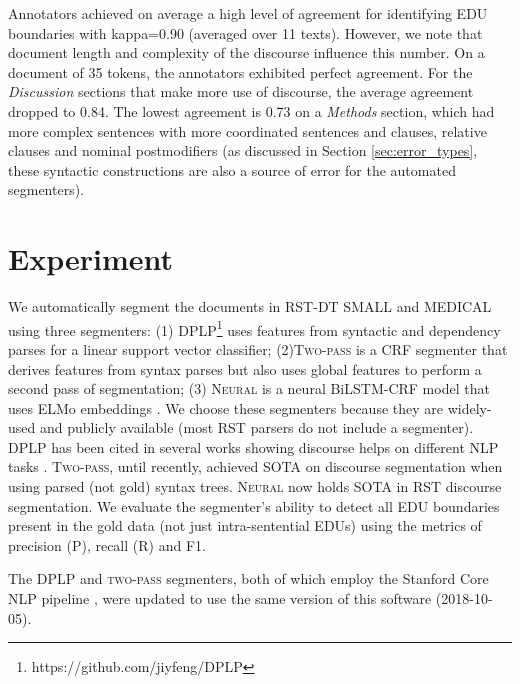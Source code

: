 \medskip
{} Annotators achieved on average a high level of agreement for identifying EDU boundaries with kappa=0.90 (averaged over 11 texts). However, we note that document length and complexity of the discourse influence this number. On a document of 35 tokens, the annotators exhibited perfect agreement. For the \textit{Discussion} sections that make more use of discourse, the average agreement dropped to 0.84. The lowest agreement is 0.73 on a \textit{Methods} section, which had more complex sentences with more coordinated sentences and clauses, relative clauses and nominal postmodifiers (as discussed in Section \ref{sec:error_types}, these syntactic constructions are also a source of error for the automated segmenters).

\section{Experiment}
We automatically segment the documents in \textsc{RST-DT SMALL} and \textsc{MEDICAL} using three segmenters: (1) \textsc{DPLP}\footnote{https://github.com/jiyfeng/DPLP} uses features from syntactic and dependency parses for a linear support vector classifier; (2)\textsc{Two-pass} \cite{Feng:2014} is a CRF segmenter that derives features from syntax parses but also uses global features to perform a second pass of segmentation; (3) \textsc{Neural} \cite{Wang:2018} is a neural BiLSTM-CRF model that uses ELMo embeddings \cite{Peters:2018}. We choose these segmenters because they are widely-used and publicly available (most RST parsers do not include a segmenter). \textsc{DPLP} has been cited in several works showing discourse helps on different NLP tasks \cite{Bhatia:2015}. \textsc{Two-pass}, until recently, achieved SOTA on discourse segmentation when using parsed (not gold) syntax trees. \textsc{Neural} now holds SOTA in RST discourse segmentation. We evaluate the segmenter's ability to detect all EDU boundaries present in the gold data (not just intra-sentential EDUs) using the metrics of precision (P), recall (R) and F1.

The \textsc{DPLP} and \textsc{two-pass} segmenters, both of which employ the Stanford Core NLP pipeline \cite{Manning:2014}, were updated to use the same version of this software (2018-10-05).


